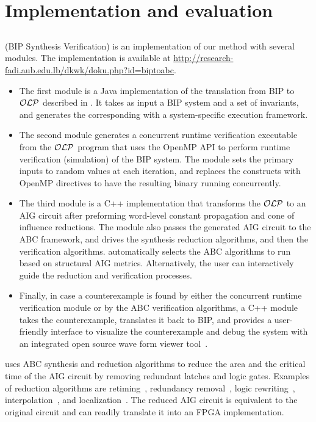 \section{Implementation and evaluation}
\label{sec:implem}
%
\subsection{\biptool{}}
\label{chap:implementation:bip}
%
\biptool{} (BIP Synthesis Verification) is an implementation of our method with several modules. 
The implementation is available at 
\href{http://research-fadi.aub.edu.lb/dkwk/doku.php?id=biptoabc}{http://research-fadi.aub.edu.lb/dkwk/doku.php?id=biptoabc}. 
%
\begin{itemize}
  \item
  The first module is a Java implementation of the translation from BIP to $\mathcal{OLP}$ described in .
It takes as input a BIP system and a set of invariants,
and generates the corresponding \caig{} with a system-specific execution framework. 
%
\item
The second module generates a concurrent runtime verification 
  executable from the $\mathcal{OLP}$ 
  program that uses the OpenMP API to perform runtime 
  verification (simulation) of the BIP system. 
  The module sets the primary inputs to random values at each iteration,
  and replaces the  constructs with OpenMP directives
  to have the resulting binary running concurrently. 
%
  \item
  The third module is a C++ implementation that transforms the $\mathcal{OLP}$ to an AIG circuit after preforming word-level constant propagation and cone of influence reductions. 
    The module also passes the generated AIG circuit to the ABC framework, and drives the synthesis reduction algorithms, and then the verification algorithms.
    \biptool{} automatically selects the ABC algorithms to run based on structural
    AIG metrics. Alternatively, the user can 
    interactively guide the reduction and verification processes. 
%
\item Finally, in case a counterexample is found by either the 
concurrent runtime verification module or by the ABC verification algorithms, 
a C++ module takes the counterexample, 
translates it back to BIP, and provides a user-friendly interface 
to visualize the counterexample and debug the system with an integrated open source wave form viewer tool~\cite{bybell2010gtkwave}.  
\end{itemize}
%
\biptool{} uses ABC synthesis and reduction algorithms to reduce the area 
and the critical time of the AIG circuit by 
removing redundant latches and logic gates.
Examples of reduction algorithms are
retiming~\cite{KuBa01}, 
redundancy removal~\cite{HmBPK05,KuMP01,BjesseC00,aziz-fmsd-00}, 
logic rewriting~\cite{BjBo04}, interpolation~\cite{McMillan03}, 
and localization~\cite{Wang03}. 
%
The reduced AIG circuit is equivalent to the original circuit and \biptool{}
can readily translate it into an FPGA implementation. 

